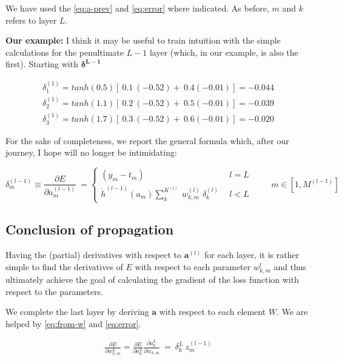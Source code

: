 \documentclass{article}
\begin{document}
We have used the \eqref{eq:a-prev} and \eqref{eq:error} where indicated. As before, $m$ and $k$ refers to layer $L$.

\textbf{Our example:} I think it may be useful to train intuition with the simple calculations for the penultimate $L-1$ layer (which, in our example, is also the first). Starting with $\boldsymbol{\delta^{L-1}}$


\begin{gather*}
\delta _{1}^{( 1)} =tan\dot{h}( 0.5)[ \ 0.1\ ( -0.52) +\ 0.4( -0.01)] =-0.044\\
\delta _{2}^{( 1)} =tan\dot{h}( 1.1)[ \ 0.2\ ( -0.52) +\ 0.5( -0.01)] =-0.039\\
\delta _{3}^{( 1)} =tan\dot{h}( 1.7)[ \ 0.3\ ( -0.52) +\ 0.6( -0.01)] =-0.020
\end{gather*}

\begin{center}\textleaf\end{center}


For the sake of completeness, we report the general formula which, after our journey, I hope will no longer be intimidating:


\begin{equation}
\delta _{m}^{( l-1)} \equiv \frac{\partial E}{\partial a_{m}^{( l-1)}} \ =\begin{cases}
( y_{m} -t_{m}) & l=L\\
\dot{h}^{( l-1)}( a_{m})\sum _{k}^{K^{( l)}} \ w_{k,m}^{( l)} \ \delta _{k}^{( l)} \ \  & l< L
\end{cases} \ \ \ \ \ \ \ \ \ \ m\in \left[ 1,M^{( l-1)}\right] \label{eq:backprop}
\end{equation}


\subsection{Conclusion of propagation}

Having the (partial) derivatives with respect to $\boldsymbol{a}^{(l)}$ for each layer, it is rather simple to find the derivatives of $E$ with respect to each parameter $w_{k,m}^{l}$ and thus ultimately achieve the goal of calculating the gradient of the loss function with respect to the parameters.

We complete the last layer by deriving $\boldsymbol{a}$ with respect to each element $W$. We are helped by \eqref{eq:from-w} and \eqref{eq:error}.

\begin{gather*}
\frac{\partial E}{\partial w_{k,m}^{L}} 
= \frac{\partial E}{\partial a_{k}^{L}} \frac{\partial a_{k}^{L}}{\partial w_{k,m}} \ =\ \delta_k^{L} \ z_{m}^{( l-1)} \label{eq:delta-from-w} 
\end{gather*}\\
\end{document}
